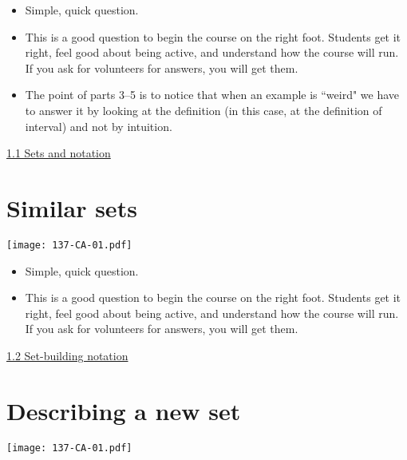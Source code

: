 \documentclass[11pt]{article}
\newcommand{\n}{\newpage}
\newcommand{\nl}{\hfill \vspace{-1.1\baselineskip}} %
\newcommand{\vone}{\hspace{8mm} \href{https://www.youtube.com/watch?v=4ca1t9noMlo&list=PLlwePzQY_wW-CPzhk-af-MXj9knthD1gx&index=1}{1.1 Sets and notation}}
\newcommand{\vtwo}{\hspace{8mm} \href{https://www.youtube.com/watch?v=GQfOWN76eTA&list=PLlwePzQY_wW-CPzhk-af-MXj9knthD1gx&index=2}{1.2 Set-building notation}}
\begin{document}
\begin{comments}
\nl
\begin{itemize}
	\item  Simple, quick question.  
	\item This is a good question to begin the course on the right foot.  Students get it right, feel good about being active, and understand how the course will run.  If you ask for volunteers for answers, you will get them.
	\item The point of parts 3--5 is to notice that when an example is ``weird" we have to answer it by looking at the definition (in this case, at the definition of interval) and not by intuition.
\end{itemize}
\end{comments}

\begin{videos}
\vone
\end{videos}

\n
\newpage
\section{Similar sets} 

\begin{center}
{ \texttt{[image: 137-CA-01.pdf]}}
\end{center}

\begin{comments}
\nl
\begin{itemize}
	\item  Simple, quick question. 
	\item This is a good question to begin the course on the right foot.  Students get it right, feel good about being active, and understand how the course will run.  If you ask for volunteers for answers, you will get them.
	
\end{itemize}
\end{comments}

\begin{videos}
\vtwo
\end{videos}

\n
\newpage
\section{Describing a new set} 

\begin{center}
{ \texttt{[image: 137-CA-01.pdf]}}
\end{center}
\end{document}
